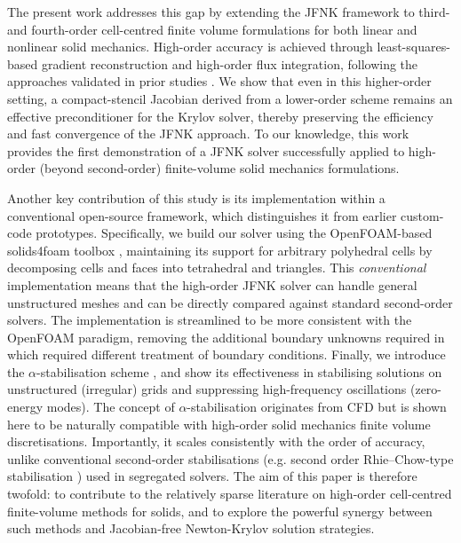 \documentclass[review,3p]{elsarticle}
\begin{document}
The present work addresses this gap by extending the JFNK framework to third- and fourth-order cell-centred finite volume formulations for both linear and nonlinear solid mechanics. High-order accuracy is achieved through least-squares-based gradient reconstruction and high-order flux integration, following the approaches validated in prior studies \cite{Castrillo2022, Castrillo2024}. We show that even in this higher-order setting, a compact-stencil Jacobian derived from a lower-order scheme remains an effective preconditioner for the Krylov solver, thereby preserving the efficiency and fast convergence of the JFNK approach. To our knowledge, this work provides the first demonstration of a JFNK solver successfully applied to high-order (beyond second-order) finite-volume solid mechanics formulations.

Another key contribution of this study is its implementation within a conventional open-source framework, which distinguishes it from earlier custom-code prototypes.
Specifically, we build our solver using the OpenFOAM-based solids4foam toolbox \cite{Weller1998, Cardiff2025a}, maintaining its support for arbitrary polyhedral cells by decomposing cells and faces into tetrahedral and triangles.
This \emph{conventional} implementation means that the high-order JFNK solver can handle general unstructured meshes and can be directly compared against standard second-order solvers.
The implementation is streamlined to be more consistent with the OpenFOAM paradigm, removing the additional boundary unknowns required in \cite{Castrillo2022, Castrillo2024} which required different treatment of boundary conditions. Finally, we introduce the $\alpha$-stabilisation scheme \cite{Antoniadis2022, Nishikawa2010, Nishikawa2011, Nishikawa2025a}, and show its effectiveness in stabilising solutions on unstructured (irregular) grids and suppressing high-frequency oscillations (zero-energy modes). The concept of $\alpha$-stabilisation originates from CFD but is shown here to be naturally compatible with high-order solid mechanics finite volume discretisations. Importantly, it scales consistently with the order of accuracy, unlike conventional second-order stabilisations (e.g. second order Rhie–Chow-type stabilisation \cite{Cardiff2025a}) used in segregated solvers. The aim of this paper is therefore twofold: to contribute to the relatively sparse literature on high-order cell-centred finite-volume methods for solids, and to explore the powerful synergy between such methods and Jacobian-free Newton-Krylov solution strategies.
\end{document}

